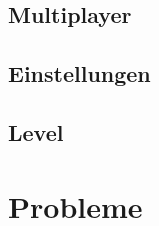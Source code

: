 \subsection{Multiplayer}
\label{subsec:implementierung:umsetzung:multiplayer}

\subsection{Einstellungen}
\label{subsec:implementierung:umsetzung:einstellungen}

\subsection{Level}
\label{subsec:implementierung:umsetzung:level}

\section{Probleme}
\label{sec:implementierung:probleme}
